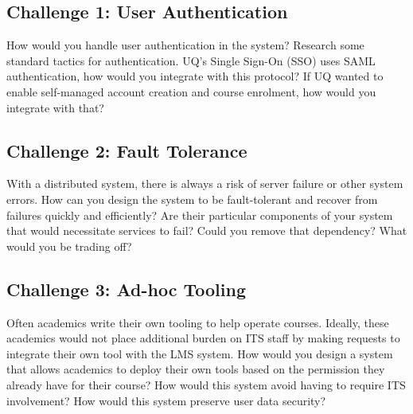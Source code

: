 \documentclass{csse4400}
\begin{document}
\subsection*{Challenge 1: User Authentication}
How would you handle user authentication in the system?
Research some standard tactics for authentication.
UQ's Single Sign-On (SSO) uses SAML authentication,
how would you integrate with this protocol?
If UQ wanted to enable self-managed account creation and course enrolment,
how would you integrate with that?

\subsection*{Challenge 2: Fault Tolerance}
With a distributed system,
there is always a risk of server failure or other system errors.
How can you design the system to be fault-tolerant and recover from failures quickly and efficiently?
Are their particular components of your system that would necessitate services to fail?
Could you remove that dependency?
What would you be trading off?

\subsection*{Challenge 3: Ad-hoc Tooling}
Often academics write their own tooling to help operate courses.
Ideally, these academics would not place additional burden on ITS staff by making requests to integrate their own tool with the LMS system.
How would you design a system that allows academics to deploy their own tools based on the permission they already have for their course?
How would this system avoid having to require ITS involvement?
How would this system preserve user data security?
\end{document}
